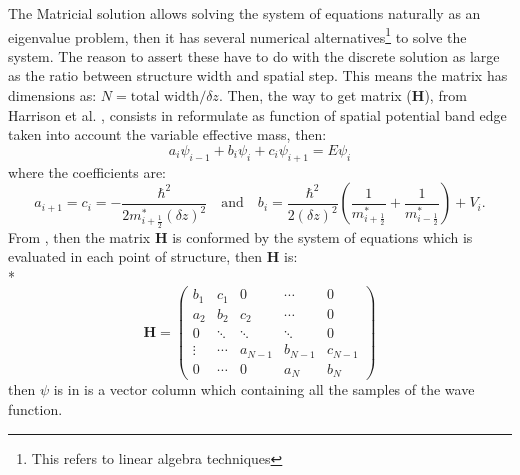 The Matricial solution allows solving the system of equations naturally as an eigenvalue problem, then it has several numerical alternatives\footnote{This refers to linear algebra techniques\cite{harrison2016quantum,davidson1993monster}} to solve the system. The reason to assert these have to do with the discrete solution as large as the ratio between structure width and spatial step. This means the matrix has  dimensions as: $N = \text{total width}/\delta z$. Then, the way to get matrix ($\textbf{H}$), from Harrison et al. \cite{harrison2016quantum}, consists in reformulate   as function of spatial potential band edge taken into account the variable effective mass, then:
\begin{equation}\label{eqn:chapter-2-sec-numerical-calculations-schrodinger-discrete-to-matrix}
	a_{i}\psi_{i-1}+b_{i}\psi_{i}+c_{i}\psi_{i+1}=E\psi_{i}
\end{equation}
where the coefficients are:
\begin{equation}\label{eqn:chapter-2-sec-numerical-calculations-schrodinger-discrete-to-matrix-coefficients}
	a_{i+1}=c_{i}= -\dfrac{\hbar^2}{2m^{*}_{i+\frac{1}{2}}(\delta z)^2} \quad \text{and}\quad b_{i}=\dfrac{\hbar^{2}}{2(\delta z)^2}\left(\dfrac{1}{m^{*}_{i+\frac{1}{2}}}+\dfrac{1}{m^{*}_{i-\frac{1}{2}}}\right)+V_{i}.
\end{equation}
From , then the matrix \textbf{H} is conformed by the system of equations which is evaluated in each point of structure, then \textbf{H} is:  \\*
\begin{equation}
	\textbf{H}=\begin{pmatrix}
		b_{1} & c_{1} & 0      &\cdots & 0\\
		a_{2} & b_{2} & c_{2}  &\cdots &0\\
		0     &\ddots &\ddots  &\ddots&0\\
		\vdots&\cdots &a_{N-1} &b_{N-1}&c_{N-1}\\
		0     &\cdots&0        &a_{N}  &b_{N} 
	\end{pmatrix}
\end{equation}
then $\psi$ is in  is a vector column which containing all the samples of the wave function. 

